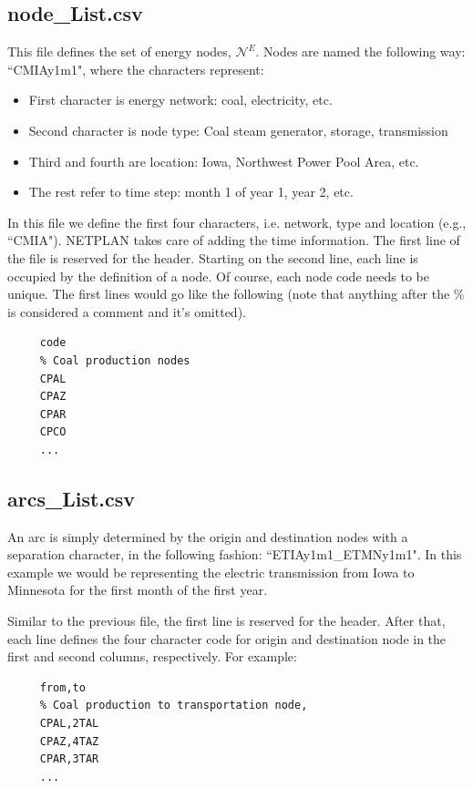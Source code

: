\documentclass{article}
\begin{document}
\subsection{node\_List.csv}

This file defines the set of energy nodes, $\mathcal{N}^E$. Nodes are named the following way: ``CMIAy1m1", where the characters represent:

\begin{itemize}
  \item First character is energy network: coal, electricity, etc.
  \item Second character is node type: Coal steam generator, storage, transmission
  \item Third and fourth are location: Iowa, Northwest Power Pool Area, etc.
  \item The rest refer to time step: month 1 of year 1, year 2, etc.
\end{itemize}

In this file we define the first four characters, i.e. network, type and location (e.g., ``CMIA"). NETPLAN takes care of adding the time information. The first line of the file is reserved for the header. Starting on the second line, each line is occupied by the definition of a node. Of course, each node code needs to be unique. The first lines would go like the following (note that anything after the \% is considered a comment and it's omitted).

\begin{verbatim}
     code
     % Coal production nodes
     CPAL
     CPAZ
     CPAR
     CPCO
     ...
\end{verbatim}


\subsection{arcs\_List.csv}

An arc is simply determined by the origin and destination nodes with a separation character, in the following fashion: ``ETIAy1m1\_ETMNy1m1". In this example we would be representing the electric transmission from Iowa to Minnesota for the first month of the first year.

Similar to the previous file, the first line is reserved for the header. After that, each line defines the four character code for origin and destination node in the first and second columns, respectively. For example:

\begin{verbatim}
     from,to
     % Coal production to transportation node,
     CPAL,2TAL
     CPAZ,4TAZ
     CPAR,3TAR
     ...
\end{verbatim}
\end{document}
